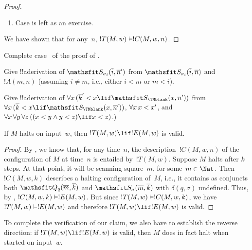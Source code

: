 \documentclass[../../../include/open-logic-section]{subfiles}
\begin{document}
\begin{proof}
\begin{enumerate}
\item Case  is left as an exercise.
\end{enumerate}
We have shown that for any~$n$, $!T(M, w) \Entails !C(M, w, n)$.
\end{proof}

\begin{prob}
Complete case~ of the proof of
.
\end{prob}

\begin{prob}
Give !!a{derivation} of $\Obj S_{\sigma_i}(\num{i}, \num{n}')$ from
$\Obj S_{\sigma_i}(\num{i}, \num{n})$ and $!A(m, n)$ (assuming $i \neq
m$, i.e., either $i < m$ or $m < i$).
\end{prob}

\begin{prob}
Give !!a{derivation} of $\lforall[x][(\num{k}' < x \lif \Obj
  S_\TMblank(x, \num{n}'))]$ from $\lforall[x][(\num{k} < x \lif \Obj
  S_\TMblank(x, \num{n}'))]$, $\lforall[x][x < x']$, and
$\lforall[x][\lforall[y][\lforall[z][ ((x < y \land y < z) \lif x <
      z)]]]$.)
\end{prob}


\begin{lem}
If $M$ halts on input~$w$, then $!T(M, w) \lif
!E(M, w)$ is valid.
\end{lem}

\begin{proof}
By , we know that, for any time~$n$, the
description~$!C(M, w, n)$ of the configuration of $M$ at time~$n$ is
entailed by~$!T(M, w)$.  Suppose $M$ halts after $k$ steps. At that
point, it will be scanning square~$m$, for some~$m \in \Nat$. Then
$!C(M, w, k)$ describes a halting configuration of~$M$, i.e., it
contains as conjuncts both $\Obj Q_q(\num{m}, \num{k})$ and $\Obj
S_\sigma(\num{m}, \num{k})$ with $\delta(q,\sigma)$ undefined.  Thus,
by , $!C(M, w, k) \Entails !E(M,
w)$. But since $!T(M, w) \Entails !C(M, w, k)$, we have $!T(M, w)
\Entails !E(M, w)$ and therefore $!T(M, w) \lif !E(M, w)$ is valid.
\end{proof}


\begin{explain} 
To complete the verification of our claim, we also have to
establish the reverse direction: if $!T(M, w) \lif !E(M, w)$ is valid, then
$M$ does in fact halt when started on input~$w$. 
\end{explain}
\end{document}
